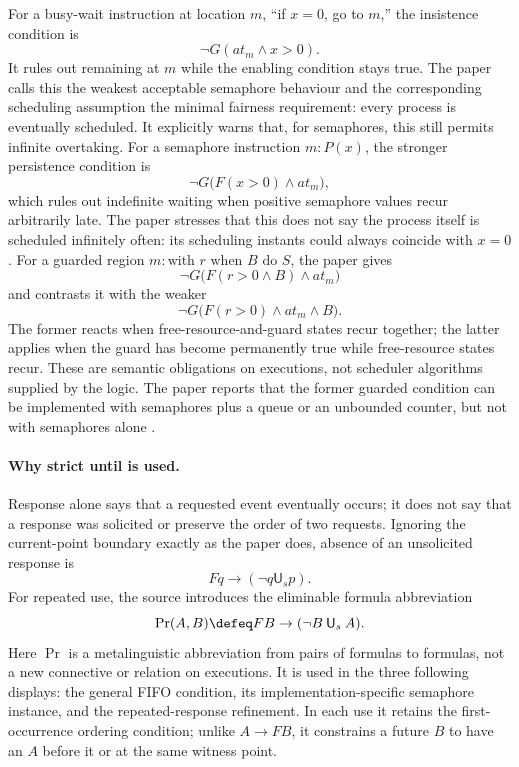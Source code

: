 For a busy-wait instruction at location \(m\), ``if \(x=0\), go to \(m\),''
the insistence condition is
\[
 \neg G(\mathit{at}_m\land x>0).
\]
It rules out remaining at \(m\) while the enabling condition stays true.  The
paper calls this the weakest acceptable semaphore behaviour and the
corresponding scheduling assumption the minimal fairness requirement: every
process is eventually scheduled.  It explicitly warns that, for semaphores,
this still permits infinite overtaking.  For a semaphore instruction
\(m:P(x)\), the stronger persistence condition is
\[
 \neg G\bigl(F(x>0)\land\mathit{at}_m\bigr),
\]
which rules out indefinite waiting when positive semaphore values recur
arbitrarily late.  The paper stresses that this does not say the process itself
is scheduled infinitely often: its scheduling instants could always coincide
with \(x=0\).  For a guarded region
\(m:\text{with }r\text{ when }B\text{ do }S\), the paper gives
\[
 \neg G\bigl(F(r>0\land B)\land\mathit{at}_m\bigr)
\]
and contrasts it with the weaker
\[
 \neg G\bigl(F(r>0)\land\mathit{at}_m\land B\bigr).
\]
The former reacts when free-resource-and-guard states recur together; the
latter applies when the guard has become permanently true while free-resource
states recur.  These are semantic obligations on executions, not scheduler
algorithms supplied by the logic.  The paper reports that the former guarded
condition can be implemented with semaphores plus a queue or an unbounded
counter, but not with semaphores alone
\cite[pp.~165--167]{GabbayPnueliShelahStavi1980}.

\paragraph{Why strict until is used.}
Response alone says that a requested event eventually occurs; it does not say
that a response was solicited or preserve the order of two requests.  Ignoring
the current-point boundary exactly as the paper does, absence of an unsolicited
response is
\[
 Fq\to(\neg q\mathbin{\mathsf U_s}p).
\]
For repeated use, the source introduces the eliminable formula abbreviation
\[
 \operatorname{Pr}(A,B)
 \defeq
 FB\to(\neg B\mathbin{\mathsf U_s}A).
\]
Here \(\operatorname{Pr}\) is a metalinguistic abbreviation from pairs of
formulas to formulas, not a new connective or relation on executions.  It is
used in the three following displays: the general FIFO condition, its
implementation-specific semaphore instance, and the repeated-response
refinement.  In each use it retains the first-occurrence ordering condition;
unlike \(A\to FB\), it constrains a future \(B\) to have an \(A\) before it or
at the same witness point.

